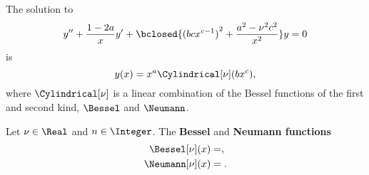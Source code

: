


\newcommand{\myemph}{\textbf}









The solution to%
\begin{equation}
    y'' + \frac{1-2a}{x}y'+ \bclosed{ {(bcx^{c-1})}^2 + \frac{a^2-\nu^2 c^2}{x^2} }y = 0
\end{equation}
is
\begin{equation}
    y(x) = x^a \Cylindrical[\nu](bx^c),
\end{equation}
where $\Cylindrical[\nu]$ is a linear combination of the Bessel functions of the first and second kind, $\Bessel$ and $\Neumann$.

Let $\nu\in\Real$ and $n\in \Integer$. The \myemph{Bessel} and \myemph{Neumann functions}
\begin{subequations}\label{eq:special:normal_Bessel}
    \begin{align}
        \Bessel[\nu](x) &= ,\\
        \Neumann[\nu](x) &= .
    \end{align}
\end{subequations}


